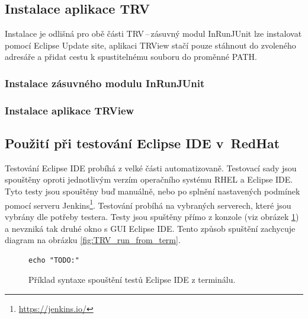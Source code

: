       \subsection{Instalace aplikace TRV}
      Instalace je odlišná pro obě části TRV\,--\,zásuvný modul InRunJUnit lze instalovat pomocí Eclipse Update site, aplikaci TRView stačí pouze stáhnout do zvoleného adresáře a přidat cestu k spustitelnému souboru do proměnné PATH.
      
      \subsubsection{Instalace zásuvného modulu InRunJUnit}
      
      \subsubsection{Instalace aplikace TRView}

    \subsection{Použití při testování Eclipse IDE v~RedHat}
    Testování Eclipse IDE probíhá z velké části automatizovaně. Testovací sady jsou spouštěny oproti jednotlivým verzím operačního systému RHEL a Eclipse IDE. Tyto testy jsou spouštěny buď manuálně, nebo po splnění nastavených podmínek pomocí serveru Jenkins\footnote{\url{https://jenkins.io/}}. Testování probíhá na vybraných serverech, které jsou vybrány dle potřeby testera. Testy jsou spuštěny přímo z konzole (viz obrázek \ref{code:run_tests_from_term}) a nevzniká tak druhé okno s GUI Eclipse IDE. Tento způsob spuštění zachycuje diagram na obrázku \ref{fig:TRV_run_from_term}. 
    
    \lstset{language=bash}
    \begin{figure}
      \begin{lstlisting}[frame=single]
echo "TODO:"
      \end{lstlisting}
      \caption{Příklad syntaxe spouštění testů Eclipse IDE z terminálu.}
      \label{code:run_tests_from_term}
    \end{figure}
    
